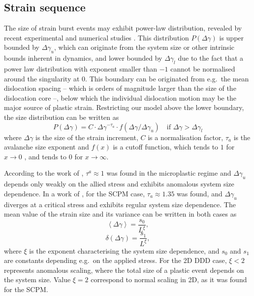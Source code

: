 \subsection{Strain sequence}
The size of strain burst events may exhibit power-law distribution, revealed by recent experimental and numerical studies \cite{Dimiduk1188,doi:10.1080/14786430802132522,PhysRevLett.112.235501,miguel2001intermittent}. This distribution $P\left( {\Delta \gamma } \right)$ is upper bounded by ${\Delta {\gamma _u}}$, which can originate from the system size or other intrinsic bounds inherent in dynamics, and lower bounded by $\Delta {\gamma _l}$ due to the fact that a power law distribution with exponent smaller than $-1$ cannot be normalised around the singularity at 0. This boundary can be originated from e.g.\ the mean dislocation spacing -- which is orders of magnitude larger than the size of the dislocation core --, below which the individual dislocation motion may be the major source of plastic strain. Restricting our model above the lower  boundary, the size distribution can be written as
\begin{equation}
P\left( {\Delta \gamma } \right) = C \cdot \Delta {\gamma ^{ - {\tau _a}}} \cdot f\left( {\Delta \gamma /\Delta {\gamma _u}} \right)\quad {\text{if }}\Delta \gamma  > \Delta {\gamma _l}
\end{equation}
where ${\Delta \gamma }$ is the size of the strain increment, $C$ is a normalisation factor, ${{\tau _a}}$ is the avalanche size exponent and $f\left( x \right)$ is a cutoff function, which tends to $1$ for $x \to 0$ , and tends to $0$ for $x \to \infty$.

According to the work of \citet{PhysRevLett.112.235501}, $\tau^a \approx 1$ was found in the microplastic regime and $\Delta \gamma_u$ depends only weakly on the allied stress and exhibits anomalous system size dependence. In a work of \citet{1742-5468-2015-2-P02011}, for the SCPM case, $\tau_a \approx 1.35$ was found, and $\Delta \gamma_u$ diverges at a critical stress and exhibits regular system size dependence. The mean value of the strain size and its variance can be written in both cases as 
\begin{equation} \label{eq:weakest_gamma_step_average}
\left\langle {\Delta \gamma } \right\rangle  = \frac{{{s_0}}}{{{L^\xi }}},
\end{equation}
\begin{equation}  \label{eq:weakest_gamma_step_deviat}
\delta \left( {\Delta \gamma } \right) = \frac{{{s_1}}}{{{L^\xi }}},
\end{equation}
where $\xi$ is the exponent characterising the system size dependence, and $s_0$ and $s_1$ are constants depending e.g.\ on the applied stress. For the 2D DDD case, $\xi < 2$ represents anomalous scaling, where the total size of a plastic event depends on the system size. Value $\xi = 2$ correspond to normal scaling in 2D, as it was found for the SCPM.

